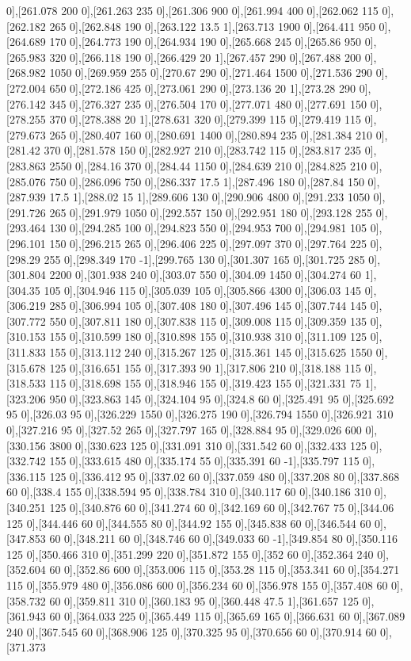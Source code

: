 {0],[261.078 200 0],[261.263 235 0],[261.306 900 0],[261.994 400 0],[262.062 115 0],[262.182 265 0],[262.848 190 0],[263.122 13.5 1],[263.713 1900 0],[264.411 950 0],[264.689 170 0],[264.773 190 0],[264.934 190 0],[265.668 245 0],[265.86 950 0],[265.983 320 0],[266.118 190 0],[266.429 20 1],[267.457 290 0],[267.488 200 0],[268.982 1050 0],[269.959 255 0],[270.67 290 0],[271.464 1500 0],[271.536 290 0],[272.004 650 0],[272.186 425 0],[273.061 290 0],[273.136 20 1],[273.28 290 0],[276.142 345 0],[276.327 235 0],[276.504 170 0],[277.071 480 0],[277.691 150 0],[278.255 370 0],[278.388 20 1],[278.631 320 0],[279.399 115 0],[279.419 115 0],[279.673 265 0],[280.407 160 0],[280.691 1400 0],[280.894 235 0],[281.384 210 0],[281.42 370 0],[281.578 150 0],[282.927 210 0],[283.742 115 0],[283.817 235 0],[283.863 2550 0],[284.16 370 0],[284.44 1150 0],[284.639 210 0],[284.825 210 0],[285.076 750 0],[286.096 750 0],[286.337 17.5 1],[287.496 180 0],[287.84 150 0],[287.939 17.5 1],[288.02 15 1],[289.606 130 0],[290.906 4800 0],[291.233 1050 0],[291.726 265 0],[291.979 1050 0],[292.557 150 0],[292.951 180 0],[293.128 255 0],[293.464 130 0],[294.285 100 0],[294.823 550 0],[294.953 700 0],[294.981 105 0],[296.101 150 0],[296.215 265 0],[296.406 225 0],[297.097 370 0],[297.764 225 0],[298.29 255 0],[298.349 170 -1],[299.765 130 0],[301.307 165 0],[301.725 285 0],[301.804 2200 0],[301.938 240 0],[303.07 550 0],[304.09 1450 0],[304.274 60 1],[304.35 105 0],[304.946 115 0],[305.039 105 0],[305.866 4300 0],[306.03 145 0],[306.219 285 0],[306.994 105 0],[307.408 180 0],[307.496 145 0],[307.744 145 0],[307.772 550 0],[307.811 180 0],[307.838 115 0],[309.008 115 0],[309.359 135 0],[310.153 155 0],[310.599 180 0],[310.898 155 0],[310.938 310 0],[311.109 125 0],[311.833 155 0],[313.112 240 0],[315.267 125 0],[315.361 145 0],[315.625 1550 0],[315.678 125 0],[316.651 155 0],[317.393 90 1],[317.806 210 0],[318.188 115 0],[318.533 115 0],[318.698 155 0],[318.946 155 0],[319.423 155 0],[321.331 75 1],[323.206 950 0],[323.863 145 0],[324.104 95 0],[324.8 60 0],[325.491 95 0],[325.692 95 0],[326.03 95 0],[326.229 1550 0],[326.275 190 0],[326.794 1550 0],[326.921 310 0],[327.216 95 0],[327.52 265 0],[327.797 165 0],[328.884 95 0],[329.026 600 0],[330.156 3800 0],[330.623 125 0],[331.091 310 0],[331.542 60 0],[332.433 125 0],[332.742 155 0],[333.615 480 0],[335.174 55 0],[335.391 60 -1],[335.797 115 0],[336.115 125 0],[336.412 95 0],[337.02 60 0],[337.059 480 0],[337.208 80 0],[337.868 60 0],[338.4 155 0],[338.594 95 0],[338.784 310 0],[340.117 60 0],[340.186 310 0],[340.251 125 0],[340.876 60 0],[341.274 60 0],[342.169 60 0],[342.767 75 0],[344.06 125 0],[344.446 60 0],[344.555 80 0],[344.92 155 0],[345.838 60 0],[346.544 60 0],[347.853 60 0],[348.211 60 0],[348.746 60 0],[349.033 60 -1],[349.854 80 0],[350.116 125 0],[350.466 310 0],[351.299 220 0],[351.872 155 0],[352 60 0],[352.364 240 0],[352.604 60 0],[352.86 600 0],[353.006 115 0],[353.28 115 0],[353.341 60 0],[354.271 115 0],[355.979 480 0],[356.086 600 0],[356.234 60 0],[356.978 155 0],[357.408 60 0],[358.732 60 0],[359.811 310 0],[360.183 95 0],[360.448 47.5 1],[361.657 125 0],[361.943 60 0],[364.033 225 0],[365.449 115 0],[365.69 165 0],[366.631 60 0],[367.089 240 0],[367.545 60 0],[368.906 125 0],[370.325 95 0],[370.656 60 0],[370.914 60 0],[371.373 }
